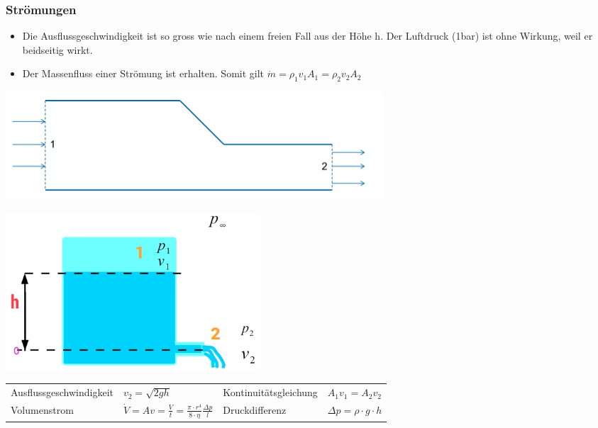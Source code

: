 \documentclass[
a4paper,
oneside,
landscape, 
8pt,
]{scrartcl}
\begin{document}
\begin{multicols*}{2}
\subsubsection{Strömungen}

\begin{itemize}
	\item Die Ausflussgeschwindigkeit ist so gross wie nach einem freien Fall aus der Höhe h. Der Luftdruck (1bar) ist ohne Wirkung, weil er beidseitig wirkt.
	\item Der Massenfluss einer Strömung ist erhalten. Somit gilt $\dot{m} =\rho_1 v_1 A_1 = \rho_2 v_2 A_2$
\end{itemize}

\begin{minipage}[h!]{0.7\linewidth}
\includegraphics[width=0.7\linewidth]{images/strom_massenerhaltung}
\end{minipage}
\hfill
\begin{minipage}[h!]{0.3\linewidth}
\includegraphics[width=0.9\linewidth]{images/torricelli}
\end{minipage}


\begin{tabbing}
	\begin{tabu} to \linewidth {X l X l}
		\toprule
		Ausflussgeschwindigkeit & $v_2 = \sqrt{2gh}$ &
		Kontinuitätsgleichung & $A_1v_1 = A_2v_2$ \\
		Volumenstrom & $\dot{V} = Av = \frac{V}{t} = \frac{\pi \cdot   r^4}{8  \cdot  \eta}\frac{\Delta p}{l}$ & 
		Druckdifferenz & $\Delta p = \rho \cdot g \cdot h$ \\
	\end{tabu}
\end{tabbing}


\end{multicols*}
\end{document}
